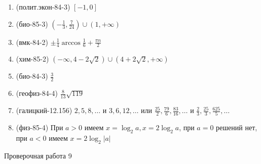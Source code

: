 \documentclass[11pt,a5paper]{report}
\begin{document}
\begin{enumerate}

\item (полит.экон-84-3) $[-1, 0]$

\item (био-85-3) $(-\frac{1}{3}, \frac{7}{24}) \cup (1, +\infty)$

\item (вмк-84-2) $\pm\frac{1}{4}\arccos\frac{1}{6}+\frac{\pi n}{2}$

\item (хим-85-2) $(-\infty, 4-2\sqrt{2}) \cup (4+2\sqrt{2}, +\infty)$

\item (био-84-3) $\frac{3}{2}$

\item (геофиз-84-4) $\frac{8}{13}\sqrt{119}$

\item (галицкий-12.156) $2, 5, 8, \dots$ и $3, 6, 12, \dots$ или $\frac{25}{2}, \frac{79}{6}, \frac{83}{16}, \dots$ и $\frac{2}{3}, \frac{25}{3}, \frac{625}{5}, \dots$  

\item (физ-85-4) При $a > 0$ имеем $x=\log_2 a, x = 2\log_2 a$, при $a = 0$ решений нет, при $a < 0$ имеем $x=2\log_2 |a|$

\end{enumerate}

\newpage

\begin{center}
Проверочная работа 9


\end{center}
\end{document}
